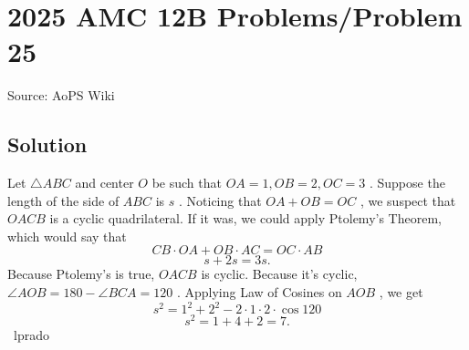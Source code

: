 \documentclass[12pt]{article}
\begin{document}
\section*{{2025 AMC 12B Problems/Problem 25}}
Source: AoPS Wiki

\subsection*{Solution}
Let $\triangle ABC$ and center $O$ be such that $OA=1, OB=2, OC=3$ . Suppose the length of the side of $ABC$ is $s$ . Noticing that $OA + OB = OC$ , we suspect that $OACB$ is a cyclic quadrilateral. If it was, we could apply Ptolemy's Theorem, which would say that \[CB \cdot OA + OB \cdot AC = OC \cdot AB\] \[s + 2s = 3s.\] Because Ptolemy's is true, $OACB$ is cyclic. Because it's cyclic, $\angle AOB = 180 - \angle BCA = 120$ . Applying Law of Cosines on $AOB$ , we get \[s^2 = 1^2 + 2^2 - 2 \cdot 1 \cdot 2 \cdot \cos{120}\] \[s^2 = 1 + 4 +2 = \boxed{7}.\] ~lprado
\end{document}
